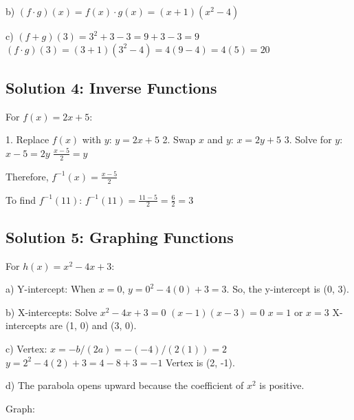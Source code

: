\documentclass[12pt]{article}
\begin{document}
b) $(f \cdot g)(x) = f(x) \cdot g(x) = (x + 1)(x^2 - 4)$

c) $(f + g)(3) = 3^2 + 3 - 3 = 9 + 3 - 3 = 9$
   $(f \cdot g)(3) = (3 + 1)(3^2 - 4) = 4(9 - 4) = 4(5) = 20$

\subsection{Solution 4: Inverse Functions}

For $f(x) = 2x + 5$:

1. Replace $f(x)$ with $y$: $y = 2x + 5$
2. Swap $x$ and $y$: $x = 2y + 5$
3. Solve for $y$: 
   $x - 5 = 2y$
   $\frac{x - 5}{2} = y$

Therefore, $f^{-1}(x) = \frac{x - 5}{2}$

To find $f^{-1}(11)$:
$f^{-1}(11) = \frac{11 - 5}{2} = \frac{6}{2} = 3$

\subsection{Solution 5: Graphing Functions}

For $h(x) = x^2 - 4x + 3$:

a) Y-intercept: When $x = 0$, $y = 0^2 - 4(0) + 3 = 3$. So, the y-intercept is (0, 3).

b) X-intercepts: Solve $x^2 - 4x + 3 = 0$
   $(x - 1)(x - 3) = 0$
   $x = 1$ or $x = 3$
   X-intercepts are (1, 0) and (3, 0).

c) Vertex: $x = -b/(2a) = -(-4)/(2(1)) = 2$
   $y = 2^2 - 4(2) + 3 = 4 - 8 + 3 = -1$
   Vertex is (2, -1).

d) The parabola opens upward because the coefficient of $x^2$ is positive.

Graph:

\begin{center}
\end{center}
\end{document}
